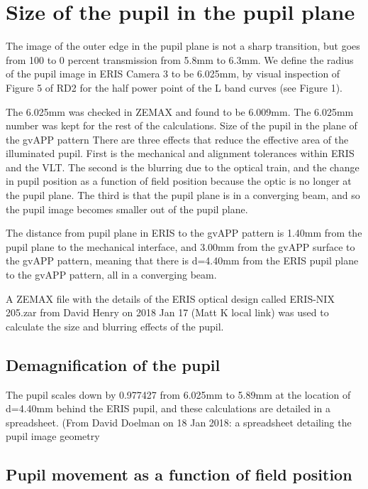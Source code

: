 \documentclass[a4paper,11pt]{article}
\begin{document}
\section{Size of the pupil in the pupil plane}

The image of the outer edge in the pupil plane is not a sharp transition, but
goes from 100 to 0 percent transmission from 5.8mm to 6.3mm. We define the
radius of the pupil image in ERIS Camera 3 to be 6.025mm, by visual inspection
of Figure 5 of RD2 for the half power point of the L band curves (see Figure
1).


The 6.025mm was checked in ZEMAX and found to be 6.009mm. The 6.025mm number
was kept for the rest of the calculations.  Size of the pupil in the plane of
the gvAPP pattern There are three effects that reduce the effective area of the
illuminated pupil. First is the mechanical and alignment tolerances within ERIS
and the VLT. The second is the blurring due to the optical train, and the
change in pupil position as a function of field position because the optic is
no longer at the pupil plane. The third is that the pupil plane is in a
converging beam, and so the pupil image becomes smaller out of the pupil plane.

The distance from pupil plane in ERIS to the gvAPP pattern is 1.40mm from the
pupil plane to the mechanical interface, and 3.00mm from the gvAPP surface to
the gvAPP pattern, meaning that there is d=4.40mm from the ERIS pupil plane to
the gvAPP pattern, all in a converging beam.

A ZEMAX file with the details of the ERIS optical design called ERIS-NIX
205.zar from David Henry on 2018 Jan 17 (Matt K local link) was used to
calculate the size and blurring effects of the pupil.


\subsection{Demagnification of the pupil}

The pupil scales down by 0.977427 from 6.025mm to 5.89mm at the location of
d=4.40mm behind the ERIS pupil, and these calculations are detailed in a
spreadsheet. (From David Doelman on 18 Jan 2018: a spreadsheet detailing the
pupil image geometry %

\subsection{Pupil movement as a function of field position}
\end{document}
